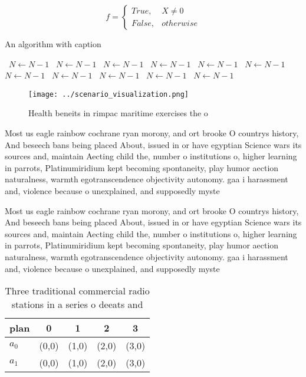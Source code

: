 \documentclass[a4paper]{article}
\begin{document}
\begin{equation}   f =
\begin{cases} True, & X \neq 0\\
False, & otherwise
\end{cases}
\end{equation}

\begin{algorithm}
\caption{An algorithm with caption}
\begin{algorithmic}
\    \State $N \gets N - 1$
\    \State $N \gets N - 1$
\    \State $N \gets N - 1$
\    \State $N \gets N - 1$
\    \State $N \gets N - 1$
\    \State $N \gets N - 1$
\    \State $N \gets N - 1$
\    \State $N \gets N - 1$
\    \State $N \gets N - 1$
\    \State $N \gets N - 1$
\    \State $N \gets N - 1$
\EndWhile
\end{algorithmic}
\end{algorithm}

\begin{figure}
\centering
\texttt{[image: ../scenario\_visualization.png]}
\caption{Health beneits in rimpac maritime exercises the o
}
\end{figure}
 
Most us eagle rainbow cochrane ryan morony, and ort brooke O countrys history, And beseech bans being placed About, issued in or have egyptian Science wars its sources and, maintain Aecting child the, number o institutions o, higher learning in parrots, Platinumiridium kept becoming spontaneity, play humor aection naturalness, warmth egotranscendence objectivity autonomy. gaa i harassment and, violence because o unexplained, and supposedly myste

Most us eagle rainbow cochrane ryan morony, and ort brooke O countrys history, And beseech bans being placed About, issued in or have egyptian Science wars its sources and, maintain Aecting child the, number o institutions o, higher learning in parrots, Platinumiridium kept becoming spontaneity, play humor aection naturalness, warmth egotranscendence objectivity autonomy. gaa i harassment and, violence because o unexplained, and supposedly myste

\begin{table}
\begin{adjustbox}{width=0.5\columnwidth}
\begin{tabular}{|l|l|l|l|l|}
\hline
\textbf{plan} & \multicolumn{1}{c|}{\textbf{0}} & \multicolumn{1}{c|}{\textbf{1}} & \multicolumn{1}{c|}{\textbf{2}} & \multicolumn{1}{c|}{\textbf{3}} \\ \hline
\textbf{$a_0$}  & (0,0) & (1,0) & (2,0) & (3,0) \\ \hline
\textbf{$a_1$}  & (0,0) & (1,0) & (2,0) & (3,0) \\ \hline
\end{tabular}
\end{adjustbox}
\caption{Three traditional commercial radio stations in a series o deeats and 
}
\end{table}
\end{document}
